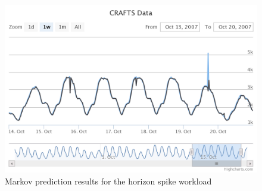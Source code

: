 \begin{figure}[H]
\centering
\includegraphics[width=\textwidth]{results/graphs/markov_horizon_spike.png}
\caption{Markov prediction results for the horizon spike workload}
\label{fig:markov_hs}
\end{figure}